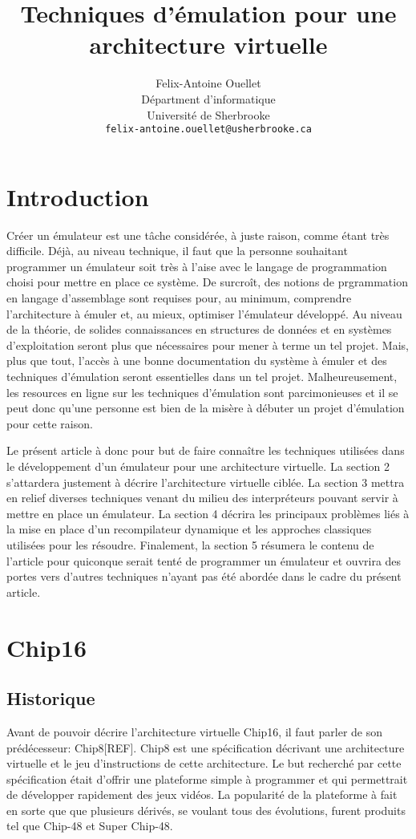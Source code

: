 \documentclass{article} %
\title{Techniques d'émulation pour une architecture virtuelle}
\author{
Felix-Antoine Ouellet \\
Départment d'informatique \\
Université de Sherbrooke \\
\texttt{felix-antoine.ouellet@usherbrooke.ca} \\
}
\begin{document}
\maketitle

\begin{abstract}
\end{abstract}

\section{Introduction}
Créer un émulateur est une tâche considérée, à juste raison, comme étant très difficile. Déjà, au niveau technique, il faut que la personne souhaitant programmer un émulateur soit très à l'aise avec le langage de programmation choisi pour mettre en place ce système. De surcroît, des notions de prgrammation en langage d'assemblage sont requises pour, au minimum, comprendre l'architecture à émuler et, au mieux, optimiser l'émulateur développé. Au niveau de la théorie, de solides connaissances en structures de données et en systèmes d'exploitation seront plus que nécessaires pour mener à terme un tel projet. Mais, plus que tout, l'accès à une bonne documentation du système à émuler et des techniques d'émulation seront essentielles dans un tel projet. Malheureusement, les resources en ligne sur les techniques d'émulation sont parcimonieuses et il se peut donc qu'une personne est bien de la misère à débuter un projet d'émulation pour cette raison.

Le présent article à donc pour but de faire connaître les techniques utilisées dans le développement d'un émulateur pour une architecture virtuelle. La section 2 s'attardera justement à décrire l'architecture virtuelle ciblée. La section 3 mettra en relief diverses techniques venant du milieu des interpréteurs pouvant servir à mettre en place un émulateur. La section 4 décrira les principaux problèmes liés à la mise en place d'un recompilateur dynamique et les approches classiques utilisées pour les résoudre. Finalement, la section 5 résumera le contenu de l'article pour quiconque serait tenté de programmer un émulateur et ouvrira des portes vers d'autres techniques n'ayant pas été abordée dans le cadre du présent article.

\section{Chip16}

\subsection{Historique}
Avant de pouvoir décrire l'architecture virtuelle Chip16, il faut parler de son prédécesseur: Chip8[REF]. Chip8 est une spécification décrivant une architecture virtuelle et le jeu d'instructions de cette architecture. Le but recherché par cette spécification était d'offrir une plateforme simple à programmer et qui permettrait de développer rapidement des jeux vidéos. La popularité de la plateforme à fait en sorte que que plusieurs dérivés, se voulant tous des évolutions, furent produits tel que Chip-48 et Super Chip-48.
\end{document}
